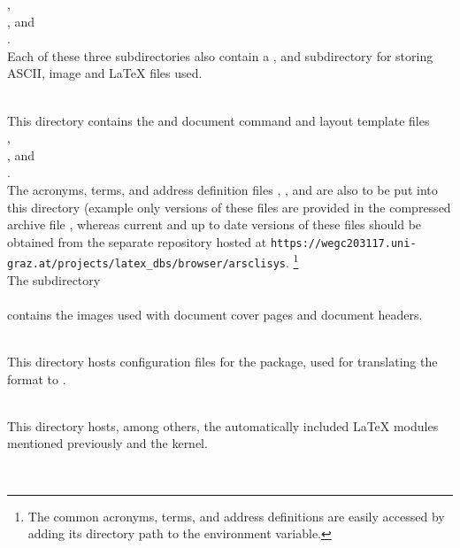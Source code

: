 \begin{description}
      , \\
      , and \\
      . \\
      Each of these three subdirectories also contain a
      ,
       and
       subdirectory for storing ASCII, image and \LaTeX{} files used.
   \item {} \\
      This directory contains the \singledoc and \multidoc document command and layout template files \\
      , \\      
      , and \\
      . \\
      The acronyms, terms, and address definition files 
      ,
      , and
       are also to be put into this directory 
      (example only versions of these files are provided in the compressed archive file
      , 
      whereas current and up to date versions of these files should be obtained from the separate 
      repository hosted at
      \nolinkurl{https://wegc203117.uni-graz.at/projects/latex_dbs/browser/arsclisys}.%
      \footnote{The common acronyms, terms, and address
        definitions are easily accessed by adding its directory path to the
         environment variable.} \\
      The subdirectory \\
       \\
      contains the images used with \multidoc document cover pages and document headers.
   \item {} \\
      This directory hosts configuration files for the  package,
      used for translating the  format to .
   \item {} \\
      This directory hosts, among others, the automatically included \LaTeX{} modules mentioned previously
      and the \wegcLaTeX{} kernel.
   \item {} \\

\end{description}
